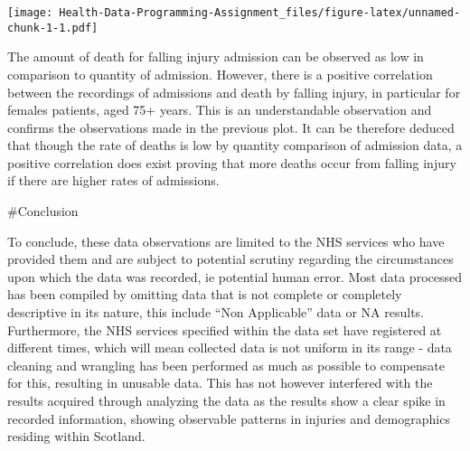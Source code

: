\documentclass[
]{article}
\begin{document}
\texttt{[image: Health-Data-Programming-Assignment\_files/figure-latex/unnamed-chunk-1-1.pdf]}

The amount of death for falling injury admission can be observed as low
in comparison to quantity of admission. However, there is a positive
correlation between the recordings of admissions and death by falling
injury, in particular for females patients, aged 75+ years. This is an
understandable observation and confirms the observations made in the
previous plot. It can be therefore deduced that though the rate of
deaths is low by quantity comparison of admission data, a positive
correlation does exist proving that more deaths occur from falling
injury if there are higher rates of admissions.

\#Conclusion

To conclude, these data observations are limited to the NHS services who
have provided them and are subject to potential scrutiny regarding the
circumstances upon which the data was recorded, ie potential human
error. Most data processed has been compiled by omitting data that is
not complete or completely descriptive in its nature, this include ``Non
Applicable'' data or NA results. Furthermore, the NHS services specified
within the data set have registered at different times, which will mean
collected data is not uniform in its range - data cleaning and wrangling
has been performed as much as possible to compensate for this, resulting
in unusable data. This has not however interfered with the results
acquired through analyzing the data as the results show a clear spike in
recorded information, showing observable patterns in injuries and
demographics residing within Scotland.
\end{document}
